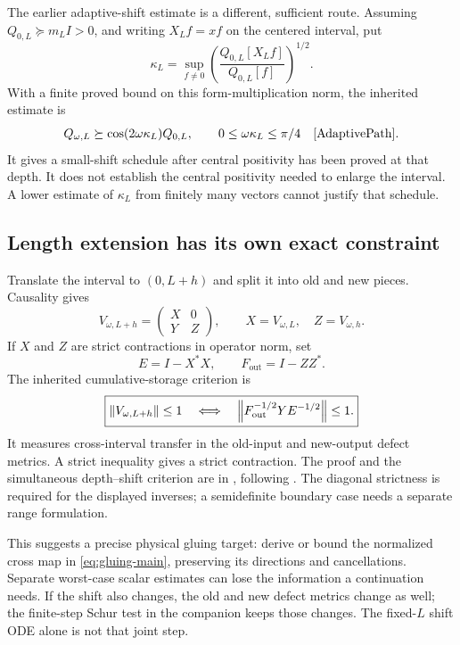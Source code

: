 The earlier adaptive-shift estimate is a different, sufficient
route. Assuming $Q_{0,L}\succeq m_LI>0$, and writing $X_Lf=xf$
on the centered interval, put
\begin{equation}
 \kappa_L=\sup_{f\ne0}
       \left(\frac{Q_{0,L}[X_Lf]}{Q_{0,L}[f]}\right)^{1/2}.
\end{equation}
With a finite proved bound on this form-multiplication norm, the
inherited estimate is
\begin{equation}
 Q_{\omega,L}\succeq
 \cos(2\omega\kappa_L)Q_{0,L},
 \qquad 0\leq\omega\kappa_L\leq\pi/4
 \quad\cite{AdaptivePath}.
\end{equation}
It gives a small-shift schedule after central positivity has
been proved at that depth. It does not establish the central
positivity needed to enlarge the interval. A lower estimate of
$\kappa_L$ from finitely many vectors cannot justify that schedule.

\subsection{Length extension has its own exact constraint}

Translate the interval to $(0,L+h)$ and split it into old and
new pieces. Causality gives
\begin{equation}
 V_{\omega,L+h}=
 \begin{pmatrix}X&0\\Y&Z\end{pmatrix},
 \qquad X=V_{\omega,L},\quad Z=V_{\omega,h}.
\end{equation}
If $X$ and $Z$ are strict contractions in operator norm, set
\[
 E=I-X^*X,\qquad F_{\mathrm{out}}=I-ZZ^*.
\]
The inherited cumulative-storage criterion is
\begin{equation}\label{eq:gluing-main}
 \boxed{\left\lVert V_{\omega,L+h}\right\rVert\leq1
 \quad\Longleftrightarrow\quad
 \left\lVert F_{\mathrm{out}}^{-1/2}YE^{-1/2}\right\rVert\leq1.}
\end{equation}
It measures cross-interval transfer in the old-input and new-output
defect metrics. A strict inequality gives a strict contraction.
The proof and the simultaneous depth--shift criterion are in
\cite[Section~S9]{Supplement}, following \cite{CumulativePath}.
The diagonal strictness is required for the displayed inverses;
a semidefinite boundary case needs a separate range formulation.

This suggests a precise physical gluing target: derive or bound
the normalized cross map in \eqref{eq:gluing-main}, preserving its
directions and cancellations. Separate worst-case scalar estimates
can lose the information a continuation needs.
If the shift also changes, the old and new defect metrics change
as well; the finite-step Schur test in the companion keeps those
changes. The fixed-$L$ shift ODE alone is not that joint step.


